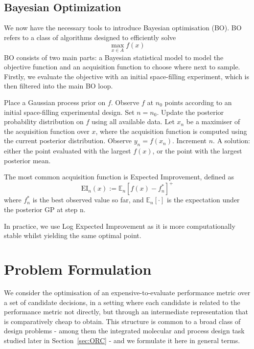 \documentclass[preprint,12pt]{elsarticle}
\begin{document}
\subsection{Bayesian Optimization}
\label{BO}
We now have the necessary tools to introduce Bayesian optimisation (BO). BO refers to a class of algorithms designed to efficiently solve 
$$
\max_{x \in A} f(x)
$$
BO consists of two main parts: a Bayesian statistical model to model the objective function and an acquisition function to choose where next to sample. Firstly, we evaluate the objective with an initial space-filling experiment, which is then filtered into the main BO loop.
\begin{algorithm}
\caption{Basic pseudo-code for Bayesian optimization \cite{frazier2018tutorial}}
\begin{algorithmic}
\State Place a Gaussian process prior on $f$.
\State Observe $f$ at $n_0$ points according to an initial space-filling experimental design. Set $n = n_0$.
    \State Update the posterior probability distribution on $f$ using all available data.
    \State Let $x_n$ be a maximiser of the acquisition function over $x$, where the acquisition function is computed using the current posterior distribution.
    \State Observe $y_n = f(x_n)$.
    \State Increment $n$.
\EndWhile
\State \Return A solution: either the point evaluated with the largest $f(x)$, or the point with the largest posterior mean.
\end{algorithmic}
\end{algorithm}


The most common acquisition function is Expected Improvement, defined as
$$
\text{EI}_n(x) := \mathbb{E}_n \left[ f(x) - f^*_n \right]^+
$$
where $f^*_n$ is the best observed value so far, and $\mathbb{E}_n[\cdot]$ is the expectation under the posterior GP at step n.

In practice, we use Log Expected Improvement as it is more computationally stable whilst yielding the same optimal point. \cite{ament2023unexpected}




\section{Problem Formulation}
\label{sec:problem}

We consider the optimisation of an expensive-to-evaluate performance metric over a set of candidate decisions, in a setting where each candidate is related to the performance metric not directly, but through an intermediate representation that is comparatively cheap to obtain. This structure is common to a broad class of design problems - among them the integrated molecular and process design task studied later in Section~\ref{sec:ORC} - and we formulate it here in general terms.
\end{document}
